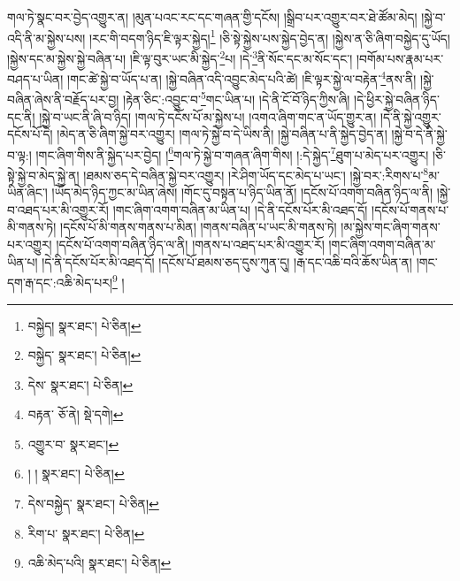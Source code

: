 གལ་ཏེ་སྣང་བར་བྱེད་འགྱུར་ན། །མུན་པའང་རང་དང་གཞན་གྱི་དངོས། །སྒྲིབ་པར་འགྱུར་བར་ཐེ་ཚོམ་མེད། །སྐྱེ་བ་འདི་ནི་མ་སྐྱེས་པས། །རང་གི་བདག་ཉིད་ཇི་ལྟར་སྐྱེད།\footnote{བསྐྱེད།  སྣར་ཐང་།  པེ་ཅིན། } །ཅི་སྟེ་སྐྱེས་པས་སྐྱེད་བྱེད་ན། །སྐྱེས་ན་ཅི་ཞིག་བསྐྱེད་དུ་ཡོད། །སྐྱེས་དང་མ་སྐྱེས་སྐྱེ་བཞིན་པ། །ཇི་ལྟ་བུར་ཡང་མི་སྐྱེད་\footnote{བསྐྱེད་  སྣར་ཐང་།  པེ་ཅིན། }པ། །དེ་\footnote{དེས་  སྣར་ཐང་།  པེ་ཅིན། }ནི་སོང་དང་མ་སོང་དང་། །བགོམ་པས་རྣམ་པར་བཤད་པ་ཡིན། །གང་ཚེ་སྐྱེ་བ་ཡོད་པ་ན། །སྐྱེ་བཞིན་འདི་འབྱུང་མེད་པའི་ཚེ། །ཇི་ལྟར་སྐྱེ་ལ་བརྟེན་\footnote{བརྟན་  ཅོ་ནེ།  སྡེ་དགེ། }ནས་ནི། །སྐྱེ་བཞིན་ཞེས་ནི་བརྗོད་པར་བྱ། །རྟེན་ཅིང་:འབྱུང་བ་\footnote{འགྱུར་བ་  སྣར་ཐང་། }གང་ཡིན་པ། །དེ་ནི་ངོ་བོ་ཉིད་ཀྱིས་ཞི། །དེ་ཕྱིར་སྐྱེ་བཞིན་ཉིད་དང་ནི། །སྐྱེ་བ་ཡང་ནི་ཞི་བ་ཉིད། །གལ་ཏེ་དངོས་པོ་མ་སྐྱེས་པ། །འགའ་ཞིག་གང་ན་ཡོད་གྱུར་ན། །དེ་ནི་སྐྱེ་འགྱུར་དངོས་པོ་དེ། །མེད་ན་ཅི་ཞིག་སྐྱེ་བར་འགྱུར། །གལ་ཏེ་སྐྱེ་བ་དེ་ཡིས་ནི། །སྐྱེ་བཞིན་པ་ནི་སྐྱེད་བྱེད་ན། །སྐྱེ་བ་དེ་ནི་སྐྱེ་བ་ལྟ:། །གང་ཞིག་གིས་ནི་སྐྱེད་པར་བྱེད། །\footnote{། །  སྣར་ཐང་།  པེ་ཅིན། }གལ་ཏེ་སྐྱེ་བ་གཞན་ཞིག་གིས། །:དེ་སྐྱེད་\footnote{དེས་བསྐྱེད་  སྣར་ཐང་།  པེ་ཅིན། }ཐུག་པ་མེད་པར་འགྱུར། །ཅི་སྟེ་སྐྱེ་བ་མེད་སྐྱེ་ན། །ཐམས་ཅད་དེ་བཞིན་སྐྱེ་བར་འགྱུར། །རེ་ཤིག་ཡོད་དང་མེད་པ་ཡང་། །སྐྱེ་བར་:རིགས་པ་\footnote{རིག་པ་  སྣར་ཐང་།  པེ་ཅིན། }མ་ཡིན་ཞིང་། །ཡོད་མེད་ཉིད་ཀྱང་མ་ཡིན་ཞེས། །གོང་དུ་བསྟན་པ་ཉིད་ཡིན་ནོ། །དངོས་པོ་འགག་བཞིན་ཉིད་ལ་ནི། །སྐྱེ་བ་འཐད་པར་མི་འགྱུར་རོ། །གང་ཞིག་འགག་བཞིན་མ་ཡིན་པ། །དེ་ནི་དངོས་པོར་མི་འཐད་དོ། །དངོས་པོ་གནས་པ་མི་གནས་ཏེ། །དངོས་པོ་མི་གནས་གནས་པ་མིན། །གནས་བཞིན་པ་ཡང་མི་གནས་ཏེ། །མ་སྐྱེས་གང་ཞིག་གནས་པར་འགྱུར། །དངོས་པོ་འགག་བཞིན་ཉིད་ལ་ནི། །གནས་པ་འཐད་པར་མི་འགྱུར་རོ། །གང་ཞིག་འགག་བཞིན་མ་ཡིན་པ། །དེ་ནི་དངོས་པོར་མི་འཐད་དོ། །དངོས་པོ་ཐམས་ཅད་དུས་ཀུན་དུ། །རྒ་དང་འཆི་བའི་ཆོས་ཡིན་ན། །གང་དག་རྒ་དང་:འཆི་མེད་པར།\footnote{འཆི་མེད་པའི།  སྣར་ཐང་།  པེ་ཅིན། } །
